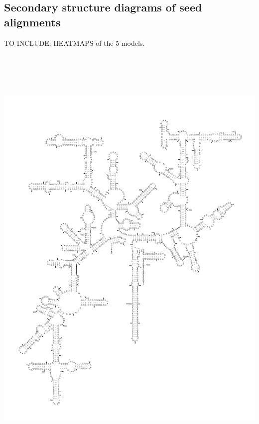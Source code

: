 \subsection{Secondary structure diagrams of seed alignments}

TO INCLUDE: HEATMAPS of the 5 models.

\begin{center}

\newpage
\includegraphics[height=8.5in]{../../seeds/ss-diagrams/archaea-0p1}


\end{center}
